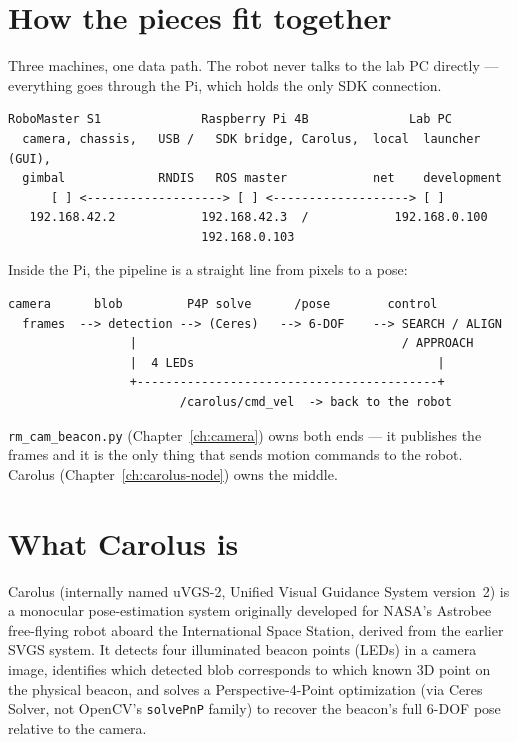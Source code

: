 \documentclass[11pt]{report}
\begin{document}
\section{How the pieces fit together}

Three machines, one data path. The robot never talks to the lab PC directly
--- everything goes through the Pi, which holds the only SDK connection.

\begin{lstlisting}[style=shell]
  RoboMaster S1              Raspberry Pi 4B              Lab PC
  camera, chassis,   USB /   SDK bridge, Carolus,  local  launcher (GUI),
  gimbal             RNDIS   ROS master            net    development
      [ ] <-------------------> [ ] <-------------------> [ ]
   192.168.42.2            192.168.42.3  /            192.168.0.100
                           192.168.0.103
\end{lstlisting}

Inside the Pi, the pipeline is a straight line from pixels to a pose:

\begin{lstlisting}[style=shell]
  camera      blob         P4P solve      /pose        control
  frames  --> detection --> (Ceres)   --> 6-DOF    --> SEARCH / ALIGN
                 |                                     / APPROACH
                 |  4 LEDs                                  |
                 +------------------------------------------+
                        /carolus/cmd_vel  -> back to the robot
\end{lstlisting}

\texttt{rm\_cam\_beacon.py} (Chapter~\ref{ch:camera}) owns both ends --- it
publishes the frames and it is the only thing that sends motion commands to
the robot. Carolus (Chapter~\ref{ch:carolus-node}) owns the middle.

\section{What Carolus is}

Carolus (internally named uVGS-2, Unified Visual Guidance System version~2)
is a monocular pose-estimation system originally developed for NASA's
Astrobee free-flying robot aboard the International Space Station, derived
from the earlier SVGS system. It detects four illuminated beacon points
(LEDs) in a camera image, identifies which detected blob corresponds to
which known 3D point on the physical beacon, and solves a Perspective-4-Point
optimization (via Ceres Solver, not OpenCV's \texttt{solvePnP} family) to
recover the beacon's full 6-DOF pose relative to the camera.
\end{document}
